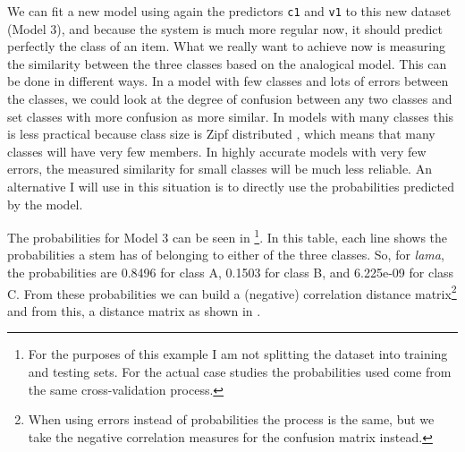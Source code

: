 We can fit a new model using again the predictors \texttt{c1} and \texttt{v1} to this new dataset (Model 3), and because the system is much more regular now, it should predict perfectly the class of an item. What we really want to achieve now is measuring the similarity between the three classes based on the analogical model. This can be done in different ways. In a model with few classes and lots of errors between the classes, we could look at the degree of confusion between any two classes and set classes with more confusion as more similar. In models with many classes this is less practical because class size is Zipf distributed \autocite{Blevins.2016}, which means that many classes will have very few members. In highly accurate models with very few errors, the measured similarity for small classes will be much less reliable. An alternative I will use in this situation is to directly use the probabilities predicted by the model.

The probabilities for Model 3 can be seen in \footnote{For the purposes of this example I am not splitting the dataset into training and testing sets. For the actual case studies the probabilities used come from the same cross-validation process.}. In this table, each line shows the probabilities a stem has of belonging to either of the three classes. So, for \textit{lama}, the probabilities are 0.8496 for class A, 0.1503 for class B, and 6.225e-09 for class C. From these probabilities we can build a (negative) correlation distance matrix\footnote{When using errors instead of probabilities the process is the same, but we take the negative correlation measures for the confusion matrix instead.} and from this, a distance matrix as shown in .

